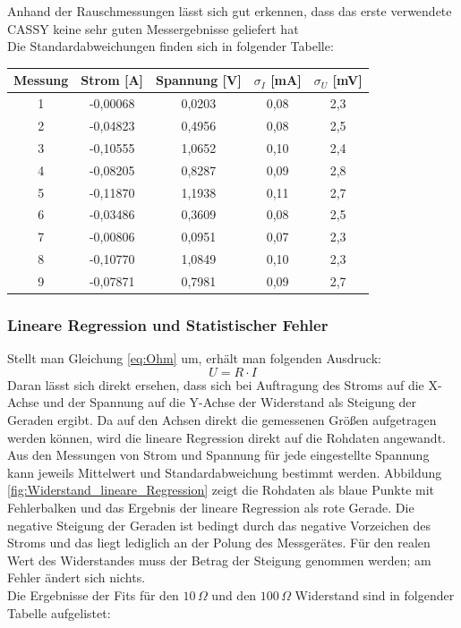\documentclass[12pt,a4paper]{article}
\begin{document}
Anhand der Rauschmessungen lässt sich gut erkennen, dass das erste verwendete CASSY keine sehr guten Messergebnisse geliefert hat \\
Die Standardabweichungen finden sich in folgender Tabelle: \\
\begin{center}
\begin{tabular}{|c|c|c|c|c|}
\hline 
Messung & Strom [A] & Spannung [V] & $\sigma_I$ [mA] & $\sigma_U$ [mV] \\ 
\hline 
1 & -0,00068 & 0,0203 & 0,08 & 2,3 \\ 
\hline 
2 & -0,04823 & 0,4956 & 0,08 & 2,5 \\ 
\hline 
3 & -0,10555 & 1,0652 & 0,10 & 2,4 \\ 
\hline 
4 & -0,08205 & 0,8287 & 0,09 & 2,8 \\ 
\hline 
5 & -0,11870 & 1,1938 & 0,11 & 2,7 \\ 
\hline 
6 & -0,03486 & 0,3609 & 0,08 & 2,5 \\ 
\hline 
7 & -0,00806 & 0,0951 & 0,07 & 2,3 \\ 
\hline 
8 & -0,10770 & 1,0849 & 0,10 & 2,3 \\ 
\hline 
9 & -0,07871 & 0,7981 & 0,09 & 2,7 \\ 
\hline 
\end{tabular}
\end{center}

\subsubsection{Lineare Regression und Statistischer Fehler}
Stellt man Gleichung \ref{eq:Ohm} um, erhält man folgenden Ausdruck:
\begin{equation}
U = R \cdot I
\end{equation}
Daran lässt sich direkt ersehen, dass sich bei Auftragung des Stroms auf die X-Achse und der Spannung auf die Y-Achse der Widerstand als Steigung der Geraden ergibt. Da auf den Achsen direkt die gemessenen Größen aufgetragen werden können, wird die lineare Regression direkt auf die Rohdaten angewandt. \\
Aus den Messungen von Strom und Spannung für jede eingestellte Spannung kann jeweils Mittelwert und Standardabweichung bestimmt werden. Abbildung \ref{fig:Widerstand_lineare_Regression} zeigt die Rohdaten als blaue Punkte mit Fehlerbalken und das Ergebnis der lineare Regression als rote Gerade. Die negative Steigung der Geraden ist bedingt durch das negative Vorzeichen des Stroms und das liegt lediglich an der Polung des Messgerätes. Für den realen Wert des Widerstandes muss der Betrag der Steigung genommen werden; am Fehler ändert sich nichts. \\
Die Ergebnisse der Fits für den $10 \, \Omega$ und den $100 \, \Omega$ Widerstand sind in folgender Tabelle aufgelistet: \\
\end{document}
